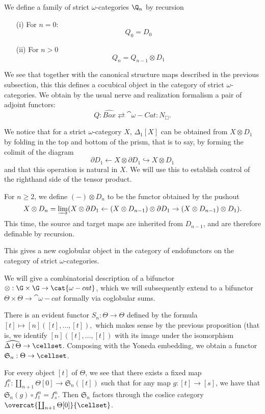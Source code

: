 We define a family of strict \(\omega\)-categories \(\Q_n\) by recursion
\begin{enumerate}
\item [(i)] For \(n=0\): \[Q_0=D_0\]
\item [(ii)] For \(n>0\) \[Q_n=Q_{n-1}\otimes D_1\]
\end{enumerate}

We see that together with the canonical structure maps described in the previous subsection, this this defines a cocubical object in the category of strict \(\omega\)-categories.  We obtain by the usual nerve and realization formalism a pair of adjoint functors: \[Q:\widehat{Box} \rightleftarrows \cat{\omega-Cat}:N_{\Box}.\]  



We notice that for a strict \(\omega\)-category \(X\), \(\Delta_1[X]\) can be obtained from \(X\otimes D_1\) by folding in the top and bottom of the prism, that is to say, by forming the colimit of the diagram \[\partial D_1 \leftarrow X\otimes \partial D_1 \hookrightarrow X\otimes D_1\] and that this operation is natural in \(X\).  We will use this to establish control of the righthand side of the tensor product.   
\begin{defn}
For \(n\geq 2\), we define \((-)\otimes D_n\) to be the functor obtained by the pushout
\[X\otimes D_n = \varinjlim(X\otimes \partial D_1 \leftarrow (X \otimes D_{n-1})\otimes \partial D_1\to (X \otimes D_{n-1})\otimes D_1).\]  This time, the source and target maps are inherited from \(D_{n-1}\), and are therefore definable by recursion.  
\end{defn}
This gives a new coglobular object in the category of endofunctors on the category of strict \(\omega\)-categories.  
 
We will give a combinatorial description of a bifunctor \(\otimes:\G\times \G \to \cat{\omega-cat}\), which we will subsequently extend to a bifunctor \(\Theta\times\Theta\to \cat{\omega-cat}\) formally via coglobular sums. 


There is an evident functor \(S_n:\Theta\to \Theta\) defined by the formula \([t]\mapsto [n]([t],\dots,[t]),\) which makes sense by the previous proposition (that is, we identify \([n]([t],\dots,[t])\) with its image under the isomorphism \(\widehat{\Delta\wr\Theta}\to\cellset\).  Composing with the Yoneda embedding, we obtain a functor \(\mathfrak{S}_n:\Theta\to \cellset\).  

For every object \([t]\) of \(\Theta\), we see that there exists a fixed map \(f^n_{t}:\coprod_{n+1} \Theta[0]\to \mathfrak{S}_n([t])\) such that for any map \(g:[t]\to [s]\), we have that \(\mathfrak{S}_n(g)\circ f^n_t =f^n_s\).  Then \(\mathfrak{S}_n\) factors through the coslice category \(\overcat{\coprod_{n+1}\Theta[0]}{\cellset}\).  

